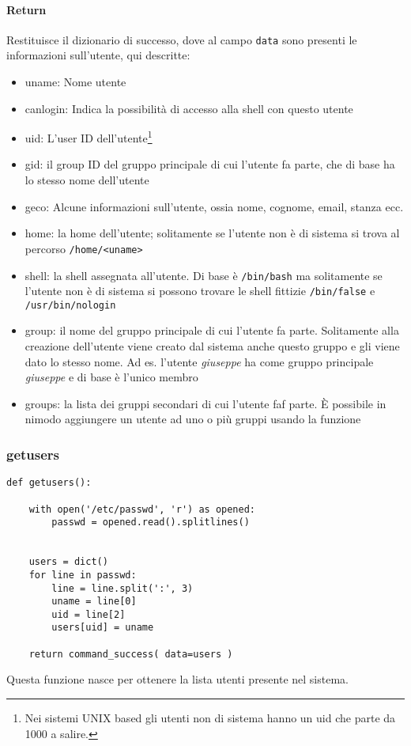 \documentclass[11pt]{article}
\begin{document}
\paragraph{Return}
Restituisce il dizionario di successo, dove al campo \texttt{data} sono presenti le informazioni sull'utente, qui descritte:
\begin{itemize}
	\item{uname: Nome utente}
	\item{canlogin: Indica la possibilità di accesso alla shell con questo utente}
	\item{uid: L'user ID dell'utente\footnote{\label{uidusers}Nei sistemi UNIX based gli utenti non di sistema hanno un uid
		che parte da 1000 a salire.}}
	\item{gid: il group ID del gruppo principale di cui l'utente fa parte, che di base ha lo stesso nome dell'utente}
	\item{geco: Alcune informazioni sull'utente, ossia nome, cognome, email, stanza ecc.}
	\item{home: la home dell'utente; solitamente se l'utente non è di sistema si trova al percorso \texttt{/home/<uname>}}
	\item{shell: la shell assegnata all'utente. Di base è \texttt{/bin/bash} ma solitamente se l'utente non è di sistema
		si possono trovare le shell fittizie \texttt{/bin/false} e \texttt{/usr/bin/nologin}}
	\item{group: il nome del gruppo principale di cui l'utente fa parte. Solitamente alla creazione dell'utente viene creato
		dal sistema anche questo gruppo e gli viene dato lo stesso nome. Ad es. l'utente \textit{giuseppe} ha come
		gruppo principale \textit{giuseppe} e di base è l'unico membro}
	\item{groups: la lista dei gruppi secondari di cui l'utente faf parte. È possibile in nimodo aggiungere un utente ad uno
		o più gruppi usando la funzione }
\end{itemize}

\subsubsection{getusers}\label{getusers}
\begin{lstlisting}
def getusers():

    with open('/etc/passwd', 'r') as opened:
        passwd = opened.read().splitlines()


    users = dict()
    for line in passwd:
        line = line.split(':', 3)
        uname = line[0]
        uid = line[2]
        users[uid] = uname

    return command_success( data=users )
\end{lstlisting}
Questa funzione nasce per ottenere la lista utenti presente nel sistema.
\end{document}

